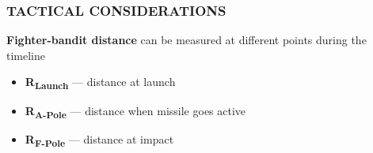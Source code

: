 
\subsubsection{TACTICAL CONSIDERATIONS}
\label{subsec:bvr:tacticalconsideration}
\begin{tcoloritemize}
    \textbf{Fighter-bandit distance} can be measured at different points during the timeline

    \begin{itemize}
        \item \textbf{R\textsubscript{Launch}} --- distance at launch
        \item \textbf{R\textsubscript{A-Pole}} --- distance when missile goes active
        \item \textbf{R\textsubscript{F-Pole}} --- distance at impact
    \end{itemize}
    

\end{tcoloritemize}
